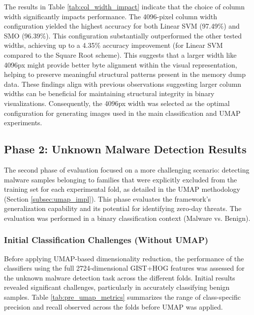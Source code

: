 The results in Table \ref{tab:col_width_impact} indicate that the choice of column width significantly impacts performance. The 4096-pixel column width configuration yielded the highest accuracy for both Linear SVM (97.49\%) and SMO (96.39\%). This configuration substantially outperformed the other tested widths, achieving up to a 4.35\% accuracy improvement (for Linear SVM compared to the Square Root scheme). This suggests that a larger width like 4096px might provide better byte alignment within the visual representation, helping to preserve meaningful structural patterns present in the memory dump data. These findings align with previous observations suggesting larger column widths can be beneficial for maintaining structural integrity in binary visualizations. Consequently, the 4096px width was selected as the optimal configuration for generating images used in the main classification and UMAP experiments.

\subsection{Phase 2: Unknown Malware Detection Results}
\label{subsec:unknown_results}

The second phase of evaluation focused on a more challenging scenario: detecting malware samples belonging to families that were explicitly excluded from the training set for each experimental fold, as detailed in the UMAP methodology (Section \ref{subsec:umap_impl}). This phase evaluates the framework's generalization capability and its potential for identifying zero-day threats. The evaluation was performed in a binary classification context (Malware vs. Benign).

\subsubsection{Initial Classification Challenges (Without UMAP)}
\label{subsubsec:pre_umap}

Before applying UMAP-based dimensionality reduction, the performance of the classifiers using the full 2724-dimensional GIST+HOG features was assessed for the unknown malware detection task across the different folds. Initial results revealed significant challenges, particularly in accurately classifying benign samples. Table \ref{tab:pre_umap_metrics} summarizes the range of class-specific precision and recall observed across the folds before UMAP was applied.

